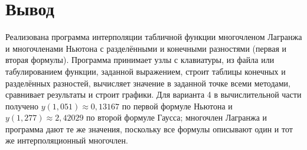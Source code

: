 \documentclass[12pt,a4paper]{article}
\begin{document}
\section*{Вывод}
Реализована программа интерполяции табличной функции многочленом Лагранжа и многочленами Ньютона с разделёнными и конечными разностями (первая и вторая формулы). Программа принимает узлы с клавиатуры, из файла или табулированием функции, заданной выражением, строит таблицы конечных и разделённых разностей, вычисляет значение в заданной точке всеми методами, сравнивает результаты и строит графики. Для варианта 4 в вычислительной части получено $y(1{,}051)\approx0{,}13167$ по первой формуле Ньютона и $y(1{,}277)\approx2{,}42029$ по второй формуле Гаусса; многочлен Лагранжа и программа дают те же значения, поскольку все формулы описывают один и тот же интерполяционный многочлен.
\end{document}
